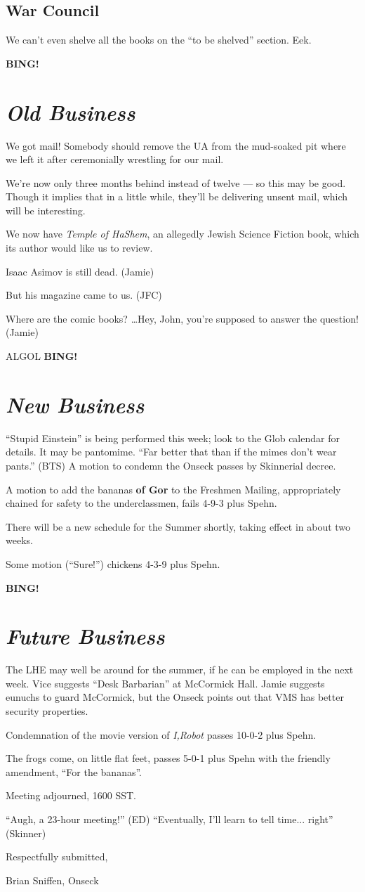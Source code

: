 \documentclass[10pt]{article}
\newcommand{\bing}{{\bf BING!} }
\newcommand{\goto}[1]{\bing \vskip 12pt \section*{{\em{#1}}}}
\newcommand{\ps}{ plus Spehn\xspace}
\begin{document}
\subsection*{War Council}
We can't even shelve all the books on the ``to be shelved'' section.  Eek.

\goto{Old Business}
We got mail!  Somebody should remove the UA from the mud-soaked pit
where we left it after ceremonially wrestling for our mail.

We're now only three months behind instead of twelve --- so this may
be good.  Though it implies that in a little while, they'll be
delivering unsent mail, which will be interesting.

We now have \emph{Temple of HaShem}, an allegedly Jewish Science
Fiction book, which its author would like us to review.

Isaac Asimov is still dead. (Jamie)

But his magazine came to us. (JFC)

Where are the comic books? \dots Hey, John, you're supposed to answer
the question! (Jamie)

ALGOL
\goto{New Business}

``Stupid Einstein'' is being performed this week; look to the Glob
calendar for details.  It may be pantomime.  ``Far better that than if
the mimes don't wear pants.'' (BTS) A motion to condemn the Onseck
passes by Skinnerial decree.

A motion to add the bananas \textbf{of Gor} to the Freshmen Mailing,
appropriately chained for safety to the underclassmen, fails 4-9-3\ps.

There will be a new schedule for the Summer shortly, taking effect in
about two weeks.

Some motion (``Sure!'') chickens 4-3-9\ps.

\goto{Future Business}

The LHE may well be around for the summer, if he can be employed in
the next week.  Vice suggests ``Desk Barbarian'' at McCormick Hall.
Jamie suggests eunuchs to guard McCormick, but the Onseck points out
that VMS has better security properties.

Condemnation of the movie version of \emph{I,Robot} passes 10-0-2\ps.

The frogs come, on little flat feet, passes 5-0-1\ps with the friendly
amendment, ``For the bananas''.


\vspace{12pt}

\noindent
Meeting adjourned, 1600 SST.

``Augh, a 23-hour meeting!'' (ED)
``Eventually, I'll learn to tell time... right'' (Skinner)

\vspace{18pt}

\centerline{Respectfully submitted,}
\centerline{Brian Sniffen, Onseck}
\end{document}
